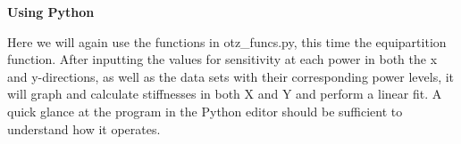 \documentclass{../lab}
\begin{document}

\textbf{Using Python}

Here we will again use the functions in otz\_funcs.py, this time the equipartition function. %
After inputting the values for sensitivity at each power in both the x and y-directions, as well as the data sets with their corresponding power levels, it will graph and calculate stiffnesses in both X and Y and perform a linear fit. A quick glance at the program in the Python editor should be sufficient to understand how it operates.


\end{document}
